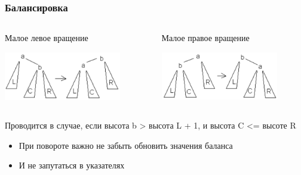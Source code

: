 \documentclass[xetex,mathserif,serif]{beamer}
\begin{document}
	\begin{frame}
		\frametitle{Балансировка}
		\begin{columns}
			\begin{column}{0.5\textwidth}
				Малое левое вращение

				\includegraphics[width=0.8\textwidth]{avlSmallLeft.png}
			\end{column}
			\begin{column}{0.5\textwidth}
				Малое правое вращение

				\includegraphics[width=0.8\textwidth]{avlSmallRight.png}
			\end{column}
		\end{columns}
		\vspace{3mm}
		Проводится в случае, если высота b > высота L + 1, и высота C <= высоте R
		\begin{itemize}
			\item При повороте важно не забыть обновить значения баланса
			\item И не запутаться в указателях
		\end{itemize}
	\end{frame}
\end{document}
